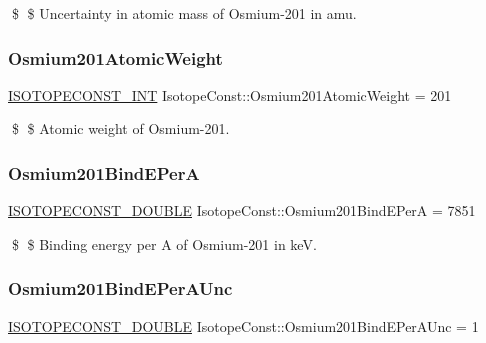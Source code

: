 \$ \$ Uncertainty in atomic mass of Osmium-\/201 in amu. \mbox{\label{group___isotope_const-_osmium-_os201_ga82b01ea5a49a181cfa0cb20d802a91b1}} 
\subsubsection{\texorpdfstring{Osmium201\+Atomic\+Weight}{Osmium201AtomicWeight}}
{\footnotesize\ttfamily \mbox{\hyperlink{group___isotope_const-_macros_ga5f18360b3e99483a35c32d789e62621c}{I\+S\+O\+T\+O\+P\+E\+C\+O\+N\+S\+T\+\_\+\+I\+NT}} Isotope\+Const\+::\+Osmium201\+Atomic\+Weight = 201}

\$ \$ Atomic weight of Osmium-\/201. \mbox{\label{group___isotope_const-_osmium-_os201_gaac74564380e384815654bdbc37686eeb}} 
\subsubsection{\texorpdfstring{Osmium201\+Bind\+E\+PerA}{Osmium201BindEPerA}}
{\footnotesize\ttfamily \mbox{\hyperlink{group___isotope_const-_macros_ga8f45a7272ce02c0b4c65c44636ed719a}{I\+S\+O\+T\+O\+P\+E\+C\+O\+N\+S\+T\+\_\+\+D\+O\+U\+B\+LE}} Isotope\+Const\+::\+Osmium201\+Bind\+E\+PerA = 7851}

\$ \$ Binding energy per A of Osmium-\/201 in keV. \mbox{\label{group___isotope_const-_osmium-_os201_ga94a8e0ce7b8cb16c345c0cc533913c04}} 
\subsubsection{\texorpdfstring{Osmium201\+Bind\+E\+Per\+A\+Unc}{Osmium201BindEPerAUnc}}
{\footnotesize\ttfamily \mbox{\hyperlink{group___isotope_const-_macros_ga8f45a7272ce02c0b4c65c44636ed719a}{I\+S\+O\+T\+O\+P\+E\+C\+O\+N\+S\+T\+\_\+\+D\+O\+U\+B\+LE}} Isotope\+Const\+::\+Osmium201\+Bind\+E\+Per\+A\+Unc = 1}

